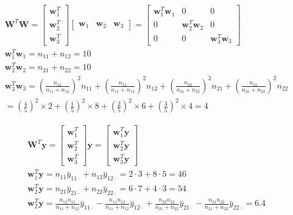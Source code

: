 \documentclass{article}
\begin{document}
\begin{enumerate}[leftmargin = 0 em, label = \arabic*., font = \bfseries]
\begin{enumerate}
	\begin{align*}
	&\bm W^T\bm W = \begin{bmatrix}
		\bm w_1^T\\ \bm w_2^T \\ \bm w_3^T
	\end{bmatrix} \begin{bmatrix}
		\bm w_1 & \bm w_2  & \bm w_3
	\end{bmatrix} = \begin{bmatrix}
		\bm w_1^T \bm w_1 & 0 & 0 \\
		0 & \bm w_2^T \bm w_2 & 0\\
		0 & 0 & \bm w_3^T \bm w_3
	\end{bmatrix}\\
	& \bm w_1^T \bm w_1 = n_{11} + n_{12} = 10\\
	& \bm w_2^T \bm w_2 = n_{21} + n_{22} = 10\\
	& \bm w_3^T \bm w_3 = \left( \frac{n_{12}}{n_{11} + n_{12}} \right)^2 n_{11} +  \left( \frac{n_{11}}{n_{11} + n_{12}} \right)^2 n_{12} + \left( \frac{n_{22}}{n_{21} + n_{22}} \right)^2 n_{21} + \left( \frac{n_{21}}{n_{21} + n_{22}} \right)^2 n_{22}\\
	& = \left( \frac{4}{5} \right)^2 \times 2 + \left( \frac{1}{5} \right)^2 \times 8 + \left( \frac{2}{5} \right)^2 \times 6 + \left( \frac{3}{5} \right)^2 \times 4 = 4    
	\end{align*}

	\begin{align*}
	& \bm W^T \bm y = \begin{bmatrix}
		\bm w_1^T \\ \bm w_2^T \\ \bm w_3^T
	\end{bmatrix} \bm y =  \begin{bmatrix}
		\bm w_1^T \bm y \\ \bm w_2^T \bm y \\ \bm w_3^T \bm y
	\end{bmatrix}\\
	& \bm w_1^T \bm y = n_{11} \bar{y}_{11 \cdot} + n_{12} \bar{y}_{12 \cdot} = 2 \cdot 3 + 8 \cdot 5 = 46\\
	& \bm w_2^T \bm y = n_{21} \bar{y}_{21 \cdot} + n_{22} \bar{y}_{22 \cdot} = 6 \cdot 7 + 4 \cdot 3 = 54 \\
	& \bm w_2^T \bm y = \frac{n_{12} n_{11}}{n_{11} + n_{12}} \bar{y}_{11 \cdot} - \frac{n_{11} n_{12}}{n_{11} + n_{12}} \bar{y}_{12 \cdot} + \frac{n_{22} n_{21}}{n_{21} + n_{22}} \bar{y}_{21 \cdot} - \frac{n_{21} n_{22}}{n_{21} + n_{22}} \bar{y}_{22 \cdot} = 6.4 
 	\end{align*}


\end{enumerate}
\end{enumerate}
\end{document}
